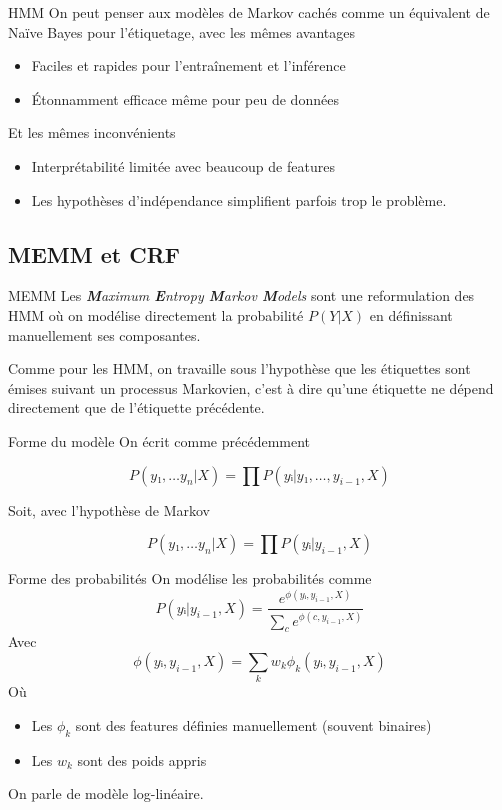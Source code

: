 \documentclass[../allslides.tex]{subfiles}
\begin{document}
\begin{frame}{HMM}
	On peut penser aux modèles de Markov cachés comme un équivalent de Naïve Bayes pour l'étiquetage, avec les mêmes avantages
	\begin{itemize}
		\item Faciles et rapides pour l'entraînement et l'inférence
		\item Étonnamment efficace même pour peu de données
	\end{itemize}
	Et les mêmes inconvénients
	\begin{itemize}
		\item Interprétabilité limitée avec beaucoup de features
		\item Les hypothèses d'indépendance simplifient parfois trop le problème.
	\end{itemize}
\end{frame}

\subsection{MEMM et CRF}
\begin{frame}{MEMM}
	Les \alert{\textit{\textbf{M}aximum \textbf{E}ntropy \textbf{M}arkov \textbf{M}odels}} sont une reformulation des HMM où on modélise directement la probabilité $P(Y|X)$ en définissant manuellement ses composantes.

	Comme pour les HMM, on travaille sous l'hypothèse que les étiquettes sont émises suivant un processus Markovien, c'est à dire qu'une étiquette ne dépend directement que de l'étiquette précédente.
\end{frame}

\begin{frame}{Forme du modèle}
	On écrit comme précédemment

	\begin{equation}
		P(y₁,…y_n|X) = ∏P(yᵢ|y₁,…, y_{i-1}, X)
	\end{equation}

	Soit, avec l'hypothèse de \alert{Markov}

	\begin{equation}
		P(y₁,…y_n|X) = ∏P(yᵢ|y_{i-1}, X)
	\end{equation}
\end{frame}

\begin{frame}{Forme des probabilités}
	On modélise les probabilités comme
	\begin{equation}
		P(yᵢ|y_{i-1}, X) = \frac{e^{ϕ(yᵢ, y_{i-1}, X)}}{∑_c e^{ϕ(c, y_{i-1}, X)}}
	\end{equation}
	Avec
	\begin{equation}
		ϕ(yᵢ, y_{i-1}, X) = \sum_k w_k  ϕ_k(yᵢ, y_{i-1}, X)
	\end{equation}
	Où
	\begin{itemize}
		\item Les $ϕ_k$ sont des features définies manuellement (souvent binaires)
		\item Les $w_k$ sont des poids appris
	\end{itemize}

	On parle de modèle \alert{log-linéaire}.
\end{frame}
\end{document}
